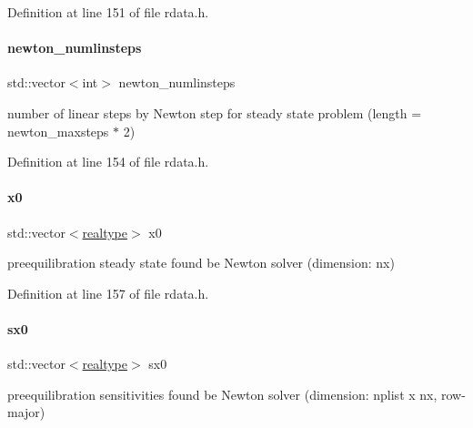 Definition at line 151 of file rdata.\+h.

\mbox{\label{classamici_1_1_return_data_a08ca5d9be9ff8f50955327334e5e87bb}} 
\paragraph{\texorpdfstring{newton\+\_\+numlinsteps}{newton\_numlinsteps}}
{\footnotesize\ttfamily std\+::vector$<$int$>$ newton\+\_\+numlinsteps}

number of linear steps by Newton step for steady state problem (length = newton\+\_\+maxsteps $\ast$ 2) 

Definition at line 154 of file rdata.\+h.

\mbox{\label{classamici_1_1_return_data_a9089beccffa9671a052e3065166dce53}} 
\paragraph{\texorpdfstring{x0}{x0}}
{\footnotesize\ttfamily std\+::vector$<$\mbox{\hyperlink{namespaceamici_a1bdce28051d6a53868f7ccbf5f2c14a3}{realtype}}$>$ x0}

preequilibration steady state found be Newton solver (dimension\+: nx) 

Definition at line 157 of file rdata.\+h.

\mbox{\label{classamici_1_1_return_data_a83cf74df5a7fee8ee66f882b898e7b63}} 
\paragraph{\texorpdfstring{sx0}{sx0}}
{\footnotesize\ttfamily std\+::vector$<$\mbox{\hyperlink{namespaceamici_a1bdce28051d6a53868f7ccbf5f2c14a3}{realtype}}$>$ sx0}

preequilibration sensitivities found be Newton solver (dimension\+: nplist x nx, row-\/major) 

